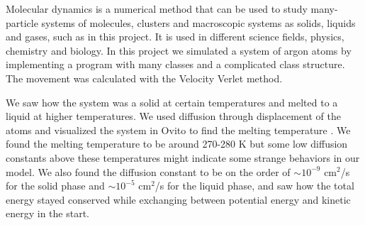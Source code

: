 Molecular dynamics is a numerical method that can be used to study many-particle systems of molecules, clusters and macroscopic systems as solids, liquids and gases, such as in this project. It is used in different science fields, physics, chemistry and biology. In this project we simulated a system of argon atoms by implementing a program with many classes and a complicated class structure. The movement was calculated with the Velocity Verlet method. 

We saw how the system was a solid at certain temperatures and melted to a liquid at higher temperatures. We used diffusion through displacement of the atoms and visualized the system in Ovito to find the melting temperature \cite{ovito}. We found the melting temperature to be around 270-280 K but some low diffusion constants above these temperatures might indicate some strange behaviors in our model. We also found the diffusion constant to be on the order of $\sim 10^{-9}$ cm$^2$/s for the solid phase and $\sim 10^{-5}$ cm$^2$/s for the liquid phase, and saw how the total energy stayed conserved while exchanging between potential energy and kinetic energy in the start. 